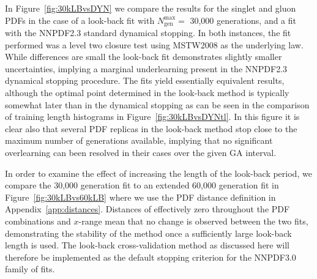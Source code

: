 In Figure~\ref{fig:30kLBvsDYN} we compare the results for the singlet and gluon PDFs in the case of a look-back fit with $N_{\text{gen}}^\text{max}=$ 30,000 generations, and a fit with the NNPDF2.3 standard dynamical stopping. In both instances, the fit performed was a level two closure test using MSTW2008 as the underlying law. While differences are small the look-back fit demonstrates slightly smaller uncertainties, implying a marginal underlearning present in the NNPDF2.3 dynamical stopping procedure. The fits yield essentially equivalent results, although the optimal point determined in the look-back method is typically somewhat later than in the dynamical stopping as can be seen in the comparison of training length histograms in Figure~\ref{fig:30kLBvsDYNtl}. In this figure it is clear also that several PDF replicas in the look-back method stop close to the maximum number of generations available, implying that no significant overlearning can been resolved in their cases over the given GA interval.

In order to examine the effect of increasing the length of the look-back period, we compare the 30,000 generation fit to an extended 60,000 generation fit in Figure~\ref{fig:30kLBvs60kLB} where we use the PDF distance definition in Appendix~\ref{app:distances}. Distances of effectively zero throughout the PDF combinations and $x$-range mean that no change is observed between the two fits, demonstrating the stability of the method once a sufficiently large look-back length is used. The look-back cross-validation method as discussed here will therefore be implemented as the default stopping criterion for the NNPDF3.0 family of fits.


